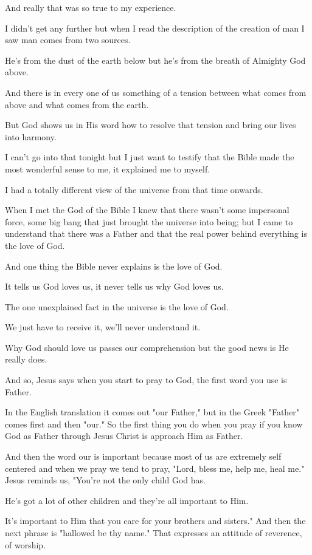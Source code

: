 \documentclass[11pt]{article}
\begin{document}
And really that was so true to my experience.

I didn't get any further but when I read the
description of the creation of man I saw man
comes from two sources.

He's from the dust of the earth below but he's
from the breath of Almighty God above.

And there is in every one of us something of a
tension between what comes from above and what
comes from the earth.

But God shows us in His word how to resolve
that tension and bring our lives into harmony.

I can't go into that tonight but I just want
to testify that the Bible made the most
wonderful sense to me, it explained me to
myself.

I had a totally different view of the universe
from that time onwards.

When I met the God of the Bible I knew that
there wasn't some impersonal force, some big
bang that just brought the universe into
being; but I came to understand that there was
a Father and that the real power behind
everything is the love of God.

And one thing the Bible never explains is the
love of God.

It tells us God loves us, it never tells us
why God loves us.

The one unexplained fact in the universe is
the love of God.

We just have to receive it, we'll never
understand it.

Why God should love us passes our
comprehension but the good news is He really
does.

And so, Jesus says when you start to pray to
God, the first word you use is Father.

In the English translation it comes out "our
Father," but in the Greek "Father" comes first
and then "our." So the first thing you do when
you pray if you know God as Father through
Jesus Christ is approach Him as Father.

And then the word our is important because
most of us are extremely self centered and
when we pray we tend to pray, "Lord, bless me,
help me, heal me." Jesus reminds us, "You're
not the only child God has.

He's got a lot of other children and they're
all important to Him.

It's important to Him that you care for your
brothers and sisters." And then the next
phrase is "hallowed be thy name." That
expresses an attitude of reverence, of
worship.
\end{document}
